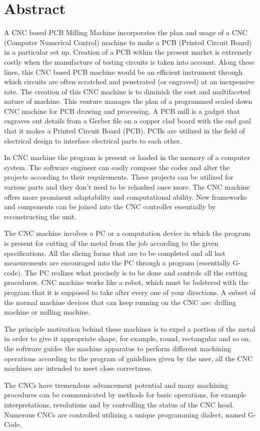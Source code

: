 \chapter*{Abstract}

A CNC based PCB Milling Machine incorporates the plan and usage of a CNC (Computer Numerical Control) machine to make a PCB (Printed Circuit Board) in a particular set up. Creation of a PCB within the present market is extremely costly when the manufacture of testing circuits is taken into account. Along these lines, this CNC based PCB machine would be an efficient instrument through which circuits are often scratched and penetrated (or engraved) at an inexpensive rate. The creation of this CNC machine is to diminish the cost and multifaceted nature of machine. This venture manages the plan of a programmed scaled down CNC machine for PCB drawing and processing.
A PCB mill is a gadget that engraves out details from a Gerber file on a copper clad board with the end goal that it makes a Printed Circuit Board (PCB). PCBs are utilized in the field of electrical design to interface electrical parts to each other.

In CNC machine the program is present or loaded in the memory of a computer system. The software engineer can easily compose the codes and alter the projects according to their requirements. These projects can be utilized for various parts and they don’t need to be rehashed once more. The CNC machine offers more prominent adaptability and computational ability. New frameworks and components can be joined into the CNC controller essentially by reconstructing the unit.

The CNC machine involves a PC or a computation device in which the program is present for cutting of the metal from the job according to the given specifications. All the slicing forms that are to be completed and all last measurements are encouraged into the PC through a program (essentially G-code). The PC realizes what precisely is to be done and controls all the cutting procedures. CNC machine works like a robot, which must be bolstered with the program that it is supposed to take after every one of your directions. A subset of the normal machine devices that can keep running on the CNC are: drilling machine or milling machine.

The principle motivation behind these machines is to expel a portion of the metal in order to give it appropriate shape, for example, round, rectangular and so on, the software guides the machine apparatus to perform different machining operations according to the program of guidelines given by the user, all the CNC machines are intended to meet close correctness.

The CNCs have tremendous advancement potential and many machining procedures can be communicated by methods for basic operations, for example interpretations, revolutions and by controlling the status of the CNC head. Numerous CNCs are controlled utilizing a unique programming dialect, named G-Code.
